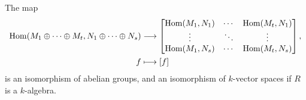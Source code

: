 \begin{theorem}
  \label{theorem: bijection homomorphisms matrices}
  The map
  \begin{align*}
    \operatorname{Hom}(M_1 \oplus \dotsb \oplus M_t, N_1 \oplus \dotsb \oplus N_s)
    &\longrightarrow
    \begin{bmatrix}
      \operatorname{Hom}(M_1, N_1)  & \cdots  & \operatorname{Hom}(M_t, N_1)  \\
      \vdots          & \ddots  & \vdots          \\
      \operatorname{Hom}(M_1, N_s)  & \cdots  & \operatorname{Hom}(M_t, N_s)
    \end{bmatrix},
    \\
    f
    &\longmapsto
    [f]
  \end{align*}
  is an isomorphism of abelian groups, and an isomorphism of $k$-vector spaces if $R$ is a $k$-algebra.
\end{theorem}


